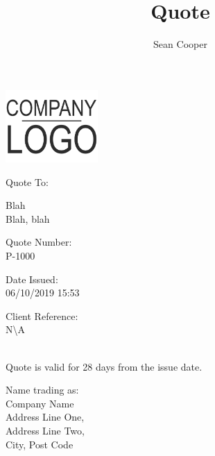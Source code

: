 \documentclass[11pt,a4paper]{letter}
\author{Sean Cooper}
\title{Quote}
\begin{document}
    \begin{center}
        \includegraphics[width=100pt]{logo.png}
    \end{center}
    \vspace{18pt}
    \fontsize{7pt}{9pt}\selectfont
    \begin{minipage}[t]{0.6415\textwidth}
    {\semibold Quote To:}
        \begin{flushleft}
            Blah \\
            Blah, blah
        \end{flushleft}
    \end{minipage}\hspace{12pt}
    \begin{minipage}[t]{0.1550\textwidth}
        \setlength{\parskip}{1em}
        {\semibold Quote Number:}\\
        P-1000\par
        {\semibold Date Issued:}\\
        06/10/2019 15:53
    \end{minipage}\hspace{12pt}
    \begin{minipage}[t]{0.1350\textwidth}
    {\semibold Client Reference:}
        \\
        N\textbackslash A
    \end{minipage}
    \\
    \fontsize{7pt}{9pt}\selectfont
    {\semibold Quote is valid for 28 days from the issue date.}\\
    \vspace*{\fill}
    \begin{center}
    {\fontsize{7pt}{9pt}\selectfont
    Name trading as:\\
    {\semiboldit Company Name}\\
    Address Line One,\\
    Address Line Two,\\
    City, Post Code\\}
    \end{center}
\end{document}
